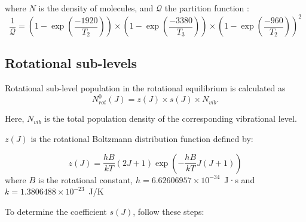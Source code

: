 \documentclass{report}
\begin{document}
where $N$ is the density of  molecules, and $\mathcal{Q}$ the partition function \cite{Witteman-1987}:
\begin{equation}
\frac{1}{\mathcal{Q}} = \left(1-\exp\left(\frac{-1920}{T_2}\right)\right) \times \left(1-\exp\left(\frac{-3380}{T_3}\right)\right) \times \left(1-\exp\left(\frac{-960}{T_2}\right)\right)^2
\end{equation}






\subsection{Rotational sub-levels}

Rotational sub-level population in the rotational equilibrium is calculated as
\begin{equation}
N_{rot}^0(J) = z(J) \times s(J) \times N_{vib}.
\end{equation}

Here, \( N_{vib} \) is the total population density of the corresponding vibrational level.

$z(J)$ is the rotational Boltzmann distribution function defined by:

\begin{equation}\label{eq:z}
z(J) = \frac{hB}{kT}(2J+1)\exp \left(-\frac{hB}{kT}J(J+1)\right)
\end{equation}
where $B$ is the rotational constant, $h = 6.62606957\times 10^{-34}$~J·s and $k = 1.3806488\times 10^{-23}$~J/K

To determine the coefficient \( s(J) \), follow these steps:
\end{document}
